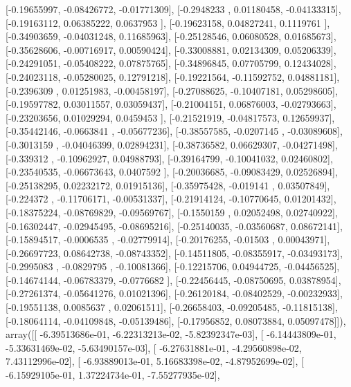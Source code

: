 \documentclass{article}
\begin{document}
       [-0.19655997, -0.08426772, -0.01771309],
       [-0.2948233 ,  0.01180458, -0.04133315],
       [-0.19163112,  0.06385222,  0.0637953 ],
       [-0.19623158,  0.04827241,  0.1119761 ],
       [-0.34903659, -0.04031248,  0.11685963],
       [-0.25128546,  0.06080528,  0.01685673],
       [-0.35628606, -0.00716917,  0.00590424],
       [-0.33008881,  0.02134309,  0.05206339],
       [-0.24291051, -0.05408222,  0.07875765],
       [-0.34896845,  0.07705799,  0.12434028],
       [-0.24023118, -0.05280025,  0.12791218],
       [-0.19221564, -0.11592752,  0.04881181],
       [-0.2396309 ,  0.01251983, -0.00458197],
       [-0.27088625, -0.10407181,  0.05298605],
       [-0.19597782,  0.03011557,  0.03059437],
       [-0.21004151,  0.06876003, -0.02793663],
       [-0.23203656,  0.01029294,  0.0459453 ],
       [-0.21521919, -0.04817573,  0.12659937],
       [-0.35442146, -0.0663841 , -0.05677236],
       [-0.38557585, -0.0207145 , -0.03089608],
       [-0.3013159 , -0.04046399,  0.02894231],
       [-0.38736582,  0.06629307, -0.04271498],
       [-0.339312  , -0.10962927,  0.04988793],
       [-0.39164799, -0.10041032,  0.02460802],
       [-0.23540535, -0.06673643,  0.0407592 ],
       [-0.20036685, -0.09083429,  0.02526894],
       [-0.25138295,  0.02232172,  0.01915136],
       [-0.35975428, -0.019141  ,  0.03507849],
       [-0.224372  , -0.11706171, -0.00531337],
       [-0.21914124, -0.10770645,  0.01201432],
       [-0.18375224, -0.08769829, -0.09569767],
       [-0.1550159 ,  0.02052498,  0.02740922],
       [-0.16302447, -0.02945495, -0.08695216],
       [-0.25140035, -0.03560687,  0.08672141],
       [-0.15894517, -0.0006535 , -0.02779914],
       [-0.20176255, -0.01503   ,  0.00043971],
       [-0.26697723,  0.08642738, -0.08743352],
       [-0.14511805, -0.08355917, -0.03493173],
       [-0.2995083 , -0.0829795 , -0.10081366],
       [-0.12215706,  0.04944725, -0.04456525],
       [-0.14674144, -0.06783379, -0.0776682 ],
       [-0.22456445, -0.08750695,  0.03878954],
       [-0.27261374, -0.05641276,  0.01021396],
       [-0.26120184, -0.08402529, -0.00232933],
       [-0.19551138,  0.0085637 ,  0.02061511],
       [-0.26658403, -0.09205485, -0.11815138],
       [-0.18064114, -0.04109848, -0.05139486],
       [-0.17956852,  0.08073884,  0.05097478]]), array([[ -6.39513686e-01,  -6.22313213e-02,  -5.82392347e-03],
       [ -6.14443809e-01,  -5.33631469e-02,  -5.63490157e-03],
       [ -6.27631881e-01,  -4.29560898e-02,   7.43112996e-02],
       [ -6.93889013e-01,   5.16683398e-02,  -4.87952699e-02],
       [ -6.15929105e-01,   1.37224734e-01,  -7.55277935e-02],
\end{document}
